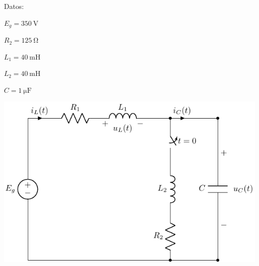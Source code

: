 \documentclass[a4paper,10pt]{article} %
\begin{document}
\begin{minipage}{0.3\textwidth}
  Datos:

  $E_g = \SI{350}{\volt}$


  $R_{2}=\SI{125}{\ohm}$%

  $L_1 = \SI{40}{\milli\henry}$%

  $L_2 = \SI{40}{\milli\henry}$%

  $C = \SI{1}{\micro\farad}$%
\end{minipage}
\begin{minipage}{0.7\textwidth}
  \includegraphics{../figs/E1_RLC.pdf}
\end{minipage}
\end{document}
